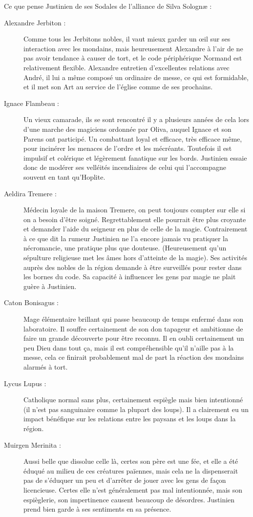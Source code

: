 Ce que pense Justinien de ses Sodales de l'alliance de Silva Solognæ :
\begin{description}
\item[Alexandre Jerbiton :] Comme tous les Jerbitons nobles, il vaut mieux garder un œil sur ses interaction avec les mondains, mais heureusement Alexandre à l'air de ne pas avoir tendance à causer de tort, et le code périphérique Normand est relativement flexible. Alexandre entretien d'excellentes relations avec André, il lui a même composé un ordinaire de messe, ce qui est formidable, et il met son Art au service de l'église comme de ses prochains.
\item[Ignace Flambeau :] Un vieux camarade, ils se sont rencontré il y a plusieurs années de cela lors d'une marche des magiciens ordonnée par Oliva, auquel Ignace et son Parens ont participé. Un combattant loyal et efficace, très efficace même, pour incinérer les menaces de l'ordre et les mécréants. Toutefois il est impulsif et colérique et légèrement fanatique sur les bords. Justinien essaie donc de modérer ses velléités incendiaires de celui qui l'accompagne souvent en tant qu'Hoplite.
\item[Aeldira Tremere :] Médecin loyale de la maison Tremere, on peut toujours compter sur elle si on a besoin d'être soigné. Regrettablement elle pourrait être plus croyante et demander l'aide du seigneur en plus de celle de la magie. Contrairement à ce que dit la rumeur Justinien ne l'a encore jamais vu pratiquer la nécromancie, une pratique plus que douteuse. (Heureusement qu'un sépulture religieuse met les âmes hors d'atteinte de la magie). Ses activités auprès des nobles de la région demande à être surveillés pour rester dans les bornes du code. Sa capacité à influencer les gens par magie ne plait guère à Justinien.
\item[Caton Bonisagus :] Mage élémentaire brillant qui passe beaucoup de temps enfermé dans son laboratoire. Il souffre certainement de son don tapageur et ambitionne de faire un grande découverte pour être reconnu. Il en oubli certainement un peu Dieu dans tout ça, mais il est compréhensible qu'il n'aille pas à la messe, cela ce finirait probablement mal de part la réaction des mondains alarmés à tort.
\item[Lycus Lupus :] Catholique normal sans plus, certainement espiègle mais bien intentionné (il n'est pas sanguinaire comme la plupart des loups). Il a clairement eu un impact bénéfique sur les relations entre les paysans et les loups dans la région.
\item[Muirgen Merinita :] Aussi belle que dissolue celle là, certes son père est une fée, et elle a été éduqué au milieu de ces créatures païennes, mais cela ne la dispenserait pas de s'éduquer un peu et d'arrêter de jouer avec les gens de façon licencieuse. Certes elle n'est généralement pas mal intentionnée, mais son espièglerie, son impertinence causent beaucoup de désordres. Justinien prend bien garde à ses sentiments en sa présence.
\end{description}

